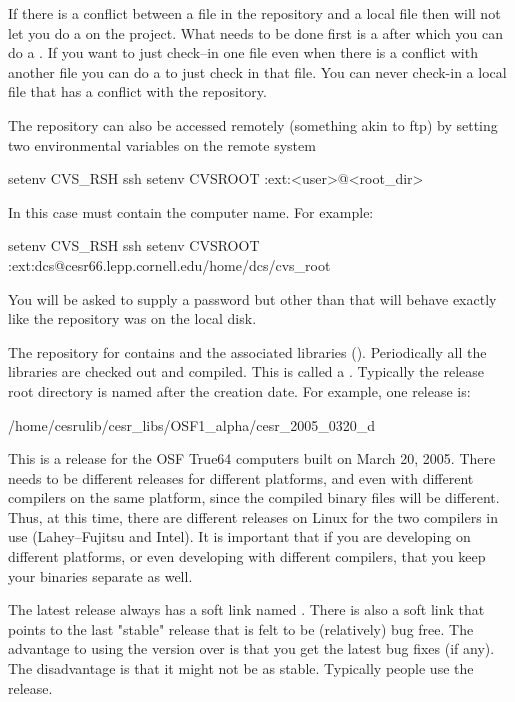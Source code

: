 If there is a conflict between a file in the repository and a local
file then \cvs will not let you do a  on the project. What
needs to be done first is a  after which you can do a
. If you want to just check--in one file even when there is
a conflict with another file you can do a  to just
check in that file. You can never check-in a local file that has a
conflict with the repository.

The repository can also be accessed remotely (something akin to ftp)
by setting two environmental variables on the remote system
\begin{example}
  setenv CVS_RSH ssh
  setenv CVSROOT :ext:<user>@<root_dir>
\end{example}
In this case  must contain the computer name. For example:
\begin{example}
  setenv CVS_RSH ssh
  setenv CVSROOT :ext:dcs@cesr66.lepp.cornell.edu/home/dcs/cvs_root
\end{example}
You will be asked to supply a password but other than that will
behave exactly like the repository was on the local disk.



The \cvs repository for \bmad contains \bmad and the associated
libraries (). Periodically all the libraries are checked
out and compiled. This is called a . Typically the release
root directory is named after the creation date. For example, one release is:
\begin{example}
  /home/cesrulib/cesr_libs/OSF1_alpha/cesr_2005_0320_d
\end{example}
This is a release for the OSF True64 computers built on March 20,
2005. There needs to be different releases for different platforms,
and even with different compilers on the same platform, since the
compiled binary files will be different. Thus, at this time, there are
different releases on Linux for the two compilers in use
(Lahey--Fujitsu and Intel). It is important that if you are developing on
different platforms, or even developing with different compilers, that
you keep your binaries separate as well.

The latest release always has a soft link named . There is
also a  soft link that points to the last "stable" release
that is felt to be (relatively) bug free. The advantage to using the
 version over  is that you get the latest bug
fixes (if any). The disadvantage is that it might not be as
stable. Typically people use the  release.

